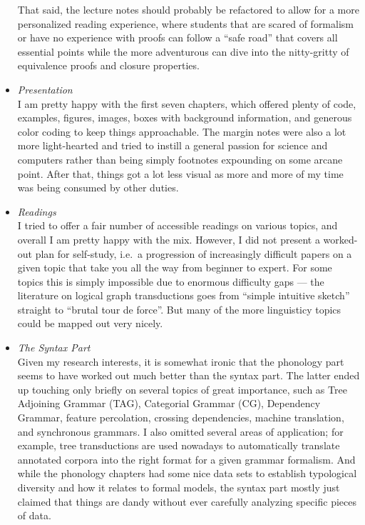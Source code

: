 \begin{itemize}
        That said, the lecture notes should probably be refactored to allow for a more personalized reading experience, where students that are scared of formalism or have no experience with proofs can follow a ``safe road'' that covers all essential points while the more adventurous can dive into the nitty-gritty of equivalence proofs and closure properties.
    \item \emph{Presentation}\\
        I am pretty happy with the first seven chapters, which offered plenty of code, examples, figures, images, boxes with background information, and generous color coding to keep things approachable.
        The margin notes were also a lot more light-hearted and tried to instill a general passion for science and computers rather than being simply footnotes expounding on some arcane point.
        After that, things got a lot less visual as more and more of my time was being consumed by other duties.
    \item \emph{Readings}\\
        I tried to offer a fair number of accessible readings on various topics, and overall I am pretty happy with the mix.
        However, I did not present a worked-out plan for self-study, i.e.\ a progression of increasingly difficult papers on a given topic that take you all the way from beginner to expert.
        For some topics this is simply impossible due to enormous difficulty gaps --- the literature on logical graph transductions goes from ``simple intuitive sketch'' straight to ``brutal tour de force''.
        But many of the more linguisticy topics could be mapped out very nicely.
    \item \emph{The Syntax Part}\\
        Given my research interests, it is somewhat ironic that the phonology part seems to have worked out much better than the syntax part.
        The latter ended up touching only briefly on several topics of great importance, such as Tree Adjoining Grammar (TAG), Categorial Grammar (CG), Dependency Grammar, feature percolation, crossing dependencies, machine translation, and synchronous grammars.
        I also omitted several areas of application; for example, tree transductions are used nowadays to automatically translate annotated corpora into the right format for a given grammar formalism.
        And while the phonology chapters had some nice data sets to establish typological diversity and how it relates to formal models, the syntax part mostly just claimed that things are dandy without ever carefully analyzing specific pieces of data.

\end{itemize}
